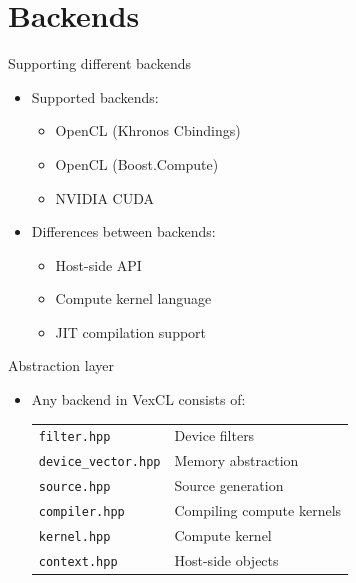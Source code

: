 \documentclass[@BEAMER_OPTIONS@]{beamer}
\newcommand{\CXX}{{\rm C}\plusplus}
\begin{document}
\section{Backends}

\begin{frame}{Supporting different backends}
    \begin{itemize}
        \item Supported backends:
            \begin{itemize}
                \item OpenCL (Khronos \CXX bindings)
                \item OpenCL (Boost.Compute)
                \item NVIDIA CUDA
            \end{itemize}
            \vspace{\baselineskip}

        \item Differences between backends:
            \begin{itemize}
                \item Host-side API
                \item Compute kernel language
                \item JIT compilation support
            \end{itemize}
    \end{itemize}
\end{frame}

\begin{frame}[fragile]{Abstraction layer}
    \begin{itemize}
        \item Any backend in VexCL consists of:
            \vspace{0.5\baselineskip}

            \begin{tabular}{ll}
                \verb|filter.hpp|        & Device filters            \\
                \verb|device_vector.hpp| & Memory abstraction        \\
                \verb|source.hpp|        & Source generation         \\
                \verb|compiler.hpp|      & Compiling compute kernels \\
                \verb|kernel.hpp|        & Compute kernel            \\
                \verb|context.hpp|       & Host-side objects         \\
            \end{tabular}
    \end{itemize}
\end{frame}
\end{document}
